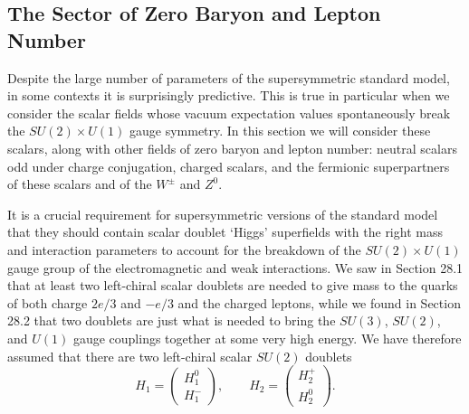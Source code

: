 
\subsection{The Sector of Zero Baryon and Lepton Number}

Despite the large number of parameters of the supersymmetric standard
model, in some contexts it is surprisingly predictive. This is true in
particular when we consider the scalar fields whose vacuum expectation
values spontaneously break the \(SU(2)\times U(1)\) gauge symmetry.
In this section we will consider these scalars, along with other fields of
zero baryon and lepton number: neutral scalars odd under charge conjugation,
charged scalars, and the fermionic superpartners of these scalars and of the
\(W^\pm\) and \(Z^0\).

It is a crucial requirement for supersymmetric versions of the standard
model that they should contain scalar doublet `Higgs' superfields with the
right mass and interaction parameters to account for the breakdown of the
\(SU(2)\times U(1)\) gauge group of the electromagnetic and weak
interactions. We saw in Section 28.1 that at least two left-chiral scalar
doublets are needed to give mass to the quarks of both charge \(2e/3\) and
\(-e/3\) and the charged leptons, while we found in Section 28.2 that two
doublets are just what is needed to bring the \(SU(3)\), \(SU(2)\), and
\(U(1)\) gauge couplings together at some very high energy. We have
therefore assumed that there are two left-chiral scalar \(SU(2)\) doublets
\begin{equation}
  H_1=
  \begin{pmatrix}
    H_1^0\\
    H_1^-
  \end{pmatrix},
  \qquad
  H_2=
  \begin{pmatrix}
    H_2^+\\
    H_2^0
  \end{pmatrix}.
  \tag{28.5.1}\label{eq:28.5.1}
\end{equation}

